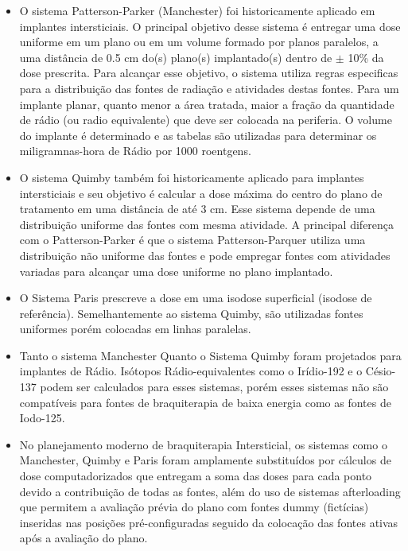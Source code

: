 \documentclass[11pt,a4paper]{article}
\newcounter{exemplo}
\begin{document}
\begin{exemplo}[Braquiterapia]
\begin{itemize}
        \item O sistema Patterson-Parker (Manchester) foi historicamente aplicado em implantes intersticiais. O principal objetivo desse sistema é entregar uma dose uniforme em um plano ou em um volume formado por planos paralelos, a uma distância de 0.5 cm do(s) plano(s) implantado(s) dentro de $\pm$ 10\% da dose prescrita. Para alcançar esse objetivo, o sistema utiliza regras especificas para a distribuição das fontes de radiação e atividades destas fontes. Para um implante planar, quanto menor a área tratada, maior a fração da quantidade de rádio (ou radio equivalente) que deve ser colocada na periferia. O volume do implante é determinado e as tabelas são utilizadas para determinar os miligramnas-hora de Rádio por 1000 roentgens. 
        
        \item O sistema Quimby também foi historicamente aplicado para implantes intersticiais e seu objetivo é calcular a dose máxima do centro do plano de tratamento em uma distância de até 3 cm. Esse sistema depende de uma distribuição uniforme das fontes com mesma atividade. A principal diferença com o Patterson-Parker é que o sistema Patterson-Parquer utiliza uma distribuição não uniforme das fontes e pode empregar fontes com atividades variadas para alcançar uma dose uniforme no plano implantado.
        
        \item O Sistema Paris prescreve a dose em uma isodose superficial (isodose de referência). Semelhantemente ao sistema Quimby, são utilizadas fontes uniformes porém colocadas em linhas paralelas.
        
        \item Tanto o sistema Manchester Quanto o Sistema Quimby foram projetados para implantes de Rádio. Isótopos Rádio-equivalentes como o Irídio-192 e o Césio-137 podem ser calculados para esses sistemas, porém esses sistemas não são compatíveis para fontes de braquiterapia de baixa energia como as fontes de Iodo-125.
        
        \item No planejamento moderno de braquiterapia Intersticial, os sistemas como o  Manchester, Quimby e Paris foram amplamente substituídos por cálculos de dose computadorizados que entregam a soma das doses para cada ponto devido a contribuição de todas as fontes, além do uso de sistemas afterloading que permitem a avaliação prévia do plano com fontes dummy (fictícias) inseridas nas posições pré-configuradas seguido da colocação das fontes ativas após a avaliação do plano. 


\end{itemize}
\end{exemplo}
\end{document}
